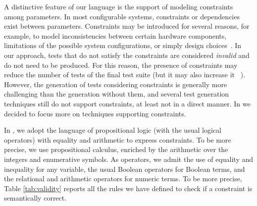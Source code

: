 \begin{tikzborder}{\cite{Gargantini16:validation}}
\begin{tikzborder}{\cite{gargantini_combinatorial_2017}}
\begin{tikzborder}{\cite{gargantini_combinatorial_2017}}
\begin{tikzborder}{\cite{garn2019}}
\begin{tikzborder}{\cite{arcaini2019achieving}}
\begin{tikzborder}{}
A distinctive feature of our language is the support of modeling constraints among parameters. 
In most configurable systems, constraints or dependencies exist between parameters. 
Constraints may be introduced for several reasons, for example, to model inconsistencies between certain hardware components, limitations of the possible system configurations, or simply design choices~\cite{CohenISSTA07}.
In our approach, tests that do not satisfy the constraints are considered \emph{invalid} and do not need to
be produced. 
For this reason, the presence of constraints may reduce the number of tests of the final test suite (but it may also increase it ~\cite{CohenISSTA07}).
However, the generation of tests considering constraints is generally more challenging than the generation without them, and several test generation techniques still do not support constraints, at least not in a direct manner.
In \ctwedge we decided to focus more on techniques supporting constraints.

In \ctwedge, we adopt the language of propositional logic (with the usual logical operators) with equality and arithmetic to express constraints. 
To be more precise, we use propositional calculus, enriched by the arithmetic over the integers and enumerative symbols. As operators, we admit the use of equality and inequality for any variable, the usual Boolean operators for Boolean terms, and the relational and arithmetic operators for numeric terms. 
To be more precise, Table \ref{tab:validity} reports all the rules we have defined to check if a constraint is semantically correct.
\end{tikzborder}

\begin{table}
	\centering
\end{table}
\end{tikzborder}
\end{tikzborder}
\end{tikzborder}
\end{tikzborder}
\end{tikzborder}
